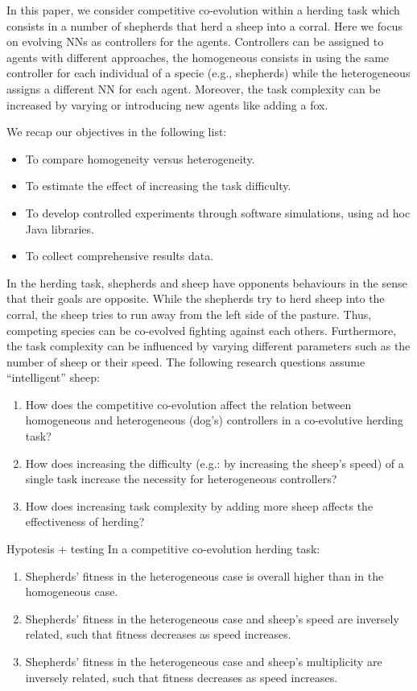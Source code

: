 \documentclass[conference]{IEEEtran}
\begin{document}
In this paper, we consider competitive co-evolution within a herding task which consists in a number of shepherds that herd a sheep into a corral.
Here we focus on evolving NNs as controllers for the agents.
Controllers can be assigned to agents with different approaches, the homogeneous consists in using the same controller for each individual of a specie (e.g., shepherds) while the heterogeneous assigns a different NN for each agent.
Moreover, the task complexity can be increased by varying or introducing new agents like adding a fox.

We recap our objectives in the following list:

\begin{itemize}
	\item To compare homogeneity versus heterogeneity.
	\item To estimate the effect of increasing the task difficulty.
 	\item To develop controlled experiments through software simulations, using ad hoc Java libraries.
	\item To collect comprehensive results data.
\end{itemize}
 
In the herding task, shepherds and sheep have opponents behaviours in the sense that their goals are opposite.
While the shepherds try to herd sheep into the corral, the sheep tries to run away from the left side of the pasture.
Thus, competing species can be co-evolved fighting against each others.
Furthermore, the task complexity can be influenced by varying different parameters such as the number of sheep or their speed.
The following research questions assume “intelligent” sheep:
 
\begin{enumerate}
	\item How does the competitive co-evolution affect the relation between homogeneous and heterogeneous (dog’s) controllers in a co-evolutive herding task?
	\item How does increasing the difficulty (e.g.: by increasing the sheep’s speed) of a single task increase the necessity for heterogeneous controllers?
	\item How does increasing task complexity by adding more sheep affects the effectiveness of herding?
\end{enumerate}

Hypotesis + testing 
In a competitive co-evolution herding task:	

\begin{enumerate}
	\item Shepherds’ fitness in the heterogeneous case is overall higher than in the homogeneous case.
	\item Shepherds’ fitness in the heterogeneous case and sheep’s speed are inversely related, such that fitness decreases as speed increases.
	\item Shepherds’ fitness in the heterogeneous case and sheep’s multiplicity are inversely related, such that fitness decreases as speed increases.
\end{enumerate}
\end{document}
